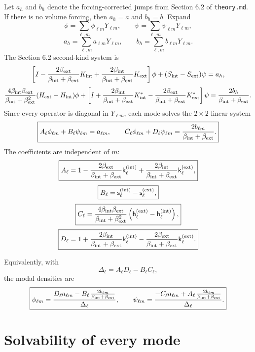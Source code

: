 \documentclass[11pt]{article}
\newcommand{\bi}{\beta_{\rm int}}
\newcommand{\be}{\beta_{\rm ext}}
\newcommand{\bsum}{\beta_{\rm int}+\beta_{\rm ext}}
\newcommand{\Ylm}{Y_{\ell m}}
\begin{document}
Let $a_h$ and $b_h$ denote the forcing-corrected jumps from Section 6.2 of
\texttt{theory.md}.  If there is no volume forcing, then $a_h=a$ and
$b_h=b$.  Expand
\[
    \phi=\sum_{\ell,m}\phi_{\ell m}\Ylm,
    \qquad
    \psi=\sum_{\ell,m}\psi_{\ell m}\Ylm,
\]
\[
    a_h=\sum_{\ell,m}a_{\ell m}\Ylm,
    \qquad
    b_h=\sum_{\ell,m}b_{\ell m}\Ylm .
\]
The Section 6.2 second-kind system is
\[
    \left[
    I-\frac{2\be}{\bsum}K_{\rm int}
      +\frac{2\bi}{\bsum}K_{\rm ext}
    \right]\phi
    +(S_{\rm int}-S_{\rm ext})\psi
    =
    a_h,
\]
\[
    \frac{4\bi\be}{\bsum^2}
    (H_{\rm ext}-H_{\rm int})\phi
    +
    \left[
    I+\frac{2\bi}{\bsum}K_{\rm int}^*
      -\frac{2\be}{\bsum}K_{\rm ext}^*
    \right]\psi
    =
    \frac{2b_h}{\bsum}.
\]
Since every operator is diagonal in $\Ylm$, each mode solves the $2\times 2$
linear system
\[
    \boxed{
    A_\ell \phi_{\ell m}+B_\ell \psi_{\ell m}=a_{\ell m},
    \qquad
    C_\ell \phi_{\ell m}+D_\ell \psi_{\ell m}
    =
    \frac{2b_{\ell m}}{\bsum}.
    }
\]
The coefficients are independent of $m$:
\[
    \boxed{
    A_\ell
    =
    1
    -
    \frac{2\be}{\bsum}\mathsf{k}_\ell^{({\rm int})}
    +
    \frac{2\bi}{\bsum}\mathsf{k}_\ell^{({\rm ext})},
    }
\]
\[
    \boxed{
    B_\ell
    =
    \mathsf{s}_\ell^{({\rm int})}
    -
    \mathsf{s}_\ell^{({\rm ext})},
    }
\]
\[
    \boxed{
    C_\ell
    =
    \frac{4\bi\be}{\bsum^2}
    \left(
    \mathsf{h}_\ell^{({\rm ext})}
    -
    \mathsf{h}_\ell^{({\rm int})}
    \right),
    }
\]
\[
    \boxed{
    D_\ell
    =
    1
    +
    \frac{2\bi}{\bsum}\mathsf{k}_\ell^{({\rm int})}
    -
    \frac{2\be}{\bsum}\mathsf{k}_\ell^{({\rm ext})}.
    }
\]

Equivalently, with
\[
    \Delta_\ell=A_\ell D_\ell-B_\ell C_\ell,
\]
the modal densities are
\[
    \boxed{
    \phi_{\ell m}
    =
    \frac{
    D_\ell a_{\ell m}
    -
    B_\ell\,\frac{2b_{\ell m}}{\bsum}
    }
    {\Delta_\ell},
    \qquad
    \psi_{\ell m}
    =
    \frac{
    -C_\ell a_{\ell m}
    +
    A_\ell\,\frac{2b_{\ell m}}{\bsum}
    }
    {\Delta_\ell}.
    }
\]

\section*{Solvability of every mode}
\end{document}
